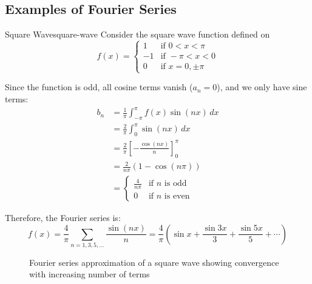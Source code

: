 \subsection{Examples of Fourier Series}
\begin{example}{Square Wave}{square-wave}
    Consider the square wave function defined on
    \begin{equation}
        f(x) = \begin{cases}
            1  & \text{if } 0 < x < \pi   \\
            -1 & \text{if } -\pi < x < 0  \\
            0  & \text{if } x = 0, \pm\pi
        \end{cases}
    \end{equation}

    Since the function is odd, all cosine terms vanish (\(a_n = 0\)), and we only have sine terms:
    \begin{align}
        b_n & = \frac{1}{\pi} \int_{-\pi}^{\pi} f(x) \sin(nx) \, dx    \\
            & = \frac{2}{\pi} \int_{0}^{\pi} \sin(nx) \, dx            \\
            & = \frac{2}{\pi} \left[-\frac{\cos(nx)}{n}\right]_0^{\pi} \\
            & = \frac{2}{n\pi}(1 - \cos(n\pi))                         \\
            & = \begin{cases}
                    \frac{4}{n\pi} & \text{if } n \text{ is odd}  \\
                    0              & \text{if } n \text{ is even}
                \end{cases}
    \end{align}

    Therefore, the Fourier series is:
    \begin{equation}
        f(x) = \frac{4}{\pi} \sum_{n=1,3,5,\ldots} \frac{\sin(nx)}{n} = \frac{4}{\pi}\left(\sin x + \frac{\sin 3x}{3} + \frac{\sin 5x}{5} + \cdots\right)
    \end{equation}
\end{example}

\begin{figure}[H]
    \centering
    
    \caption{Fourier series approximation of a square wave showing convergence with increasing number of terms}
\end{figure}

